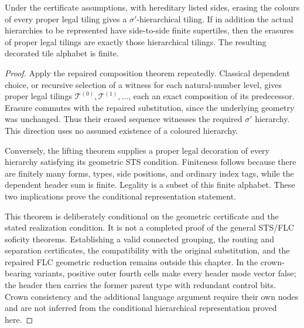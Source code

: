 \begin{theorem}
\label{thm:comp/soundness}
Under the certificate assumptions, with hereditary listed sides, erasing
the colours of every proper
legal tiling gives a $\sigma'$-hierarchical tiling. If in addition the
actual hierarchies to be represented have side-to-side finite supertiles,
then the erasures of proper legal tilings are exactly those hierarchical
tilings. The resulting decorated tile alphabet is finite.
\end{theorem}
\begin{proof}
Apply the repaired composition theorem repeatedly. Classical dependent
choice, or recursive selection of a witness for each natural-number level,
gives proper legal tilings $\mathcal T^{(0)},\mathcal T^{(1)},\ldots$,
each an exact composition of its predecessor. Erasure commutes with the
repaired substitution, since the underlying geometry was unchanged.
Thus their erased sequence witnesses the required $\sigma'$ hierarchy.
This direction uses no assumed existence of a coloured hierarchy.

Conversely, the lifting theorem supplies a proper legal decoration of
every hierarchy satisfying its geometric STS condition. Finiteness follows
because there are finitely many forms, types, side positions, and ordinary
index tags, while the dependent header sum is finite. Legality is a subset
of this finite alphabet. These two implications prove the conditional
representation statement.

This theorem is deliberately conditional on the geometric certificate and
the stated realization condition. It is not a completed proof of the
general STS/FLC soficity theorems. Establishing a valid connected grouping,
the routing and separation certificates, the compatibility with the
original substitution, and the repaired FLC geometric reduction remains
outside this chapter. In the crown-bearing variants, positive outer
fourth cells make every header mode vector false; the header then carries
the former parent type with redundant control bits. Crown consistency and
the additional language argument require their own nodes and are not
inferred from the conditional hierarchical representation proved here.
\end{proof}
